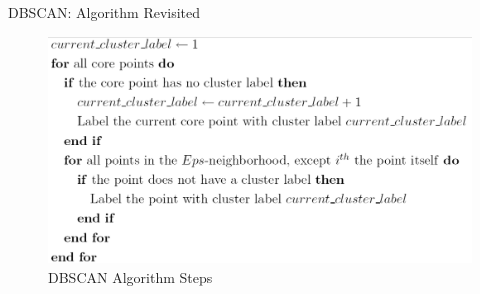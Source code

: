 \begin{frame}[allowframebreaks]{DBSCAN: Algorithm Revisited}
\begin{figure}
    \centering
    \includegraphics[height=0.75\textheight,keepaspectratio]{images/dul/dbscan/algorithm.png}
    \caption{DBSCAN Algorithm Steps}
\end{figure}
\end{frame}